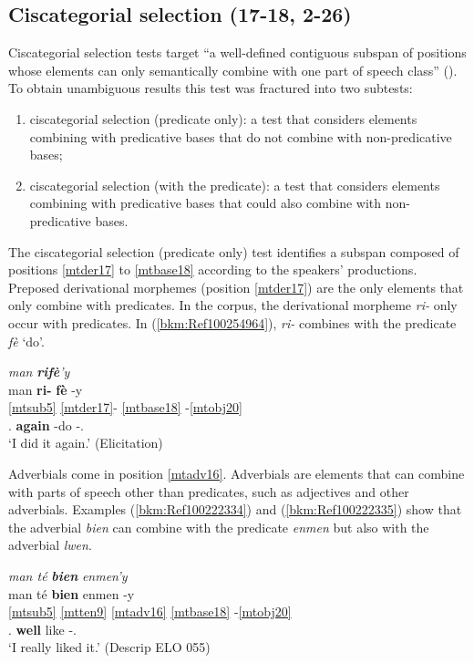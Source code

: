 \documentclass[output=paper]{langscibook}
\begin{document}
\subsection{Ciscategorial selection (17-18, 2-26)}

Ciscategorial selection tests target “a well-defined contiguous subspan of positions whose elements can only semantically combine with one part of speech class'' (\citealt[16]{tallman2021constituency}). To obtain unambiguous results this test was fractured into two subtests:

\begin{enumerate}
\item 
ciscategorial selection (predicate only): a test that considers elements combining with predicative bases that do not combine with non-predicative bases;
\item 
ciscategorial selection (with the predicate): a test that considers elements combining with predicative bases that could also combine with non-predic\-a\-tive bases.
\end{enumerate}

The ciscategorial selection (predicate only) test identifies a subspan composed of positions \ref{mtder17} to \ref{mtbase18} according to the speakers’ productions. Preposed derivational morphemes (position \ref{mtder17}) are the only elements that only combine with predicates. In the corpus, the derivational morpheme \textit{ri-} only occur with predicates. In (\ref{bkm:Ref100254964}), \textit{ri-} combines with the predicate \textit{fè} ‘do’.

\ea\label{bkm:Ref100254964}
\textit{man} \textbf{\textit{rifè}}\textit{’y}\\
\glll man \textbf{ri-} \textbf{fè} {}-y\\ 
\ref{mtsub5} \ref{mtder17}- \ref{mtbase18} -\ref{mtobj20} \\ 
\First\Sg.\Sarg{} \textbf{again} -do -\Third\Sg.\Obj{}\\
\glt `I did it again.' (Elicitation)
\z

Adverbials come in position \ref{mtadv16}. Adverbials are elements that can combine with parts of speech other than predicates, such as adjectives and other adverbials. Examples (\ref{bkm:Ref100222334}) and (\ref{bkm:Ref100222335}) show that the adverbial \textit{bien} can combine with the predicate \textit{enmen} but also with the adverbial \textit{lwen}.

\ea\label{bkm:Ref100222334}\textit{man té} \textbf{\textit{bien}} \textit{enmen’y}\\
\glll man té \textbf{bien} enmen -y\\
\ref{mtsub5} \ref{mtten9} \ref{mtadv16} \ref{mtbase18} -\ref{mtobj20} \\ 
\First\Sg.\Sarg{} \Pst{} \textbf{well} like -\Third\Sg.\Obj{}\\
\glt `I really liked it.' (Descrip ELO 055)
\z
\end{document}
